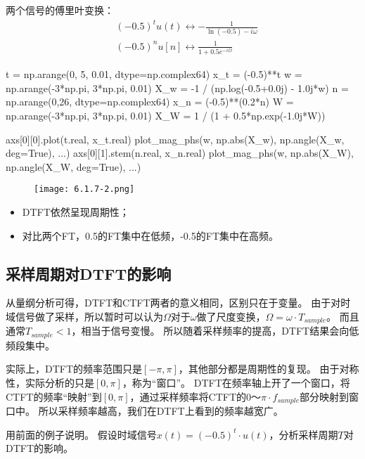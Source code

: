 两个信号的傅里叶变换：
\begin{align*}
&\left( -0.5 \right) ^tu\left( t \right) \leftrightarrow -\frac{1}{\ln \left( -0.5 \right) -i\omega} \\
&\left( -0.5 \right) ^nu\left[ n \right] \leftrightarrow \frac{1}{1+0.5e^{-i\varOmega}}
\end{align*}

\begin{python}
t   = np.arange(0, 5, 0.01, dtype=np.complex64)
x_t = (-0.5)**t
w   = np.arange(-3*np.pi, 3*np.pi, 0.01)
X_w = -1 / (np.log(-0.5+0.0j) - 1.0j*w)
n   = np.arange(0,26, dtype=np.complex64)
x_n = (-0.5)**(0.2*n)
W   = np.arange(-3*np.pi, 3*np.pi, 0.01)
X_W = 1 / (1 + 0.5*np.exp(-1.0j*W))

axs[0][0].plot(t.real, x_t.real)
plot_mag_phs(w, np.abs(X_w), np.angle(X_w, deg=True), ...)
axs[0][1].stem(n.real, x_n.real)
plot_mag_phs(w, np.abs(X_W), np.angle(X_W, deg=True), ...)
\end{python}

\begin{figure}[h]
\centering
\texttt{[image: 6.1.7-2.png]}
\end{figure}

\begin{itemize}
    \item DTFT依然呈现周期性；
    \item 对比两个FT，0.5的FT集中在低频，-0.5的FT集中在高频。
\end{itemize}

\subsection{采样周期对DTFT的影响}

从量纲分析可得，DTFT和CTFT两者的意义相同，区别只在于变量。
由于对时域信号做了采样，所以暂时可以认为$\varOmega $对于$\omega $做了尺度变换，$\varOmega =\omega \cdot T_{sample}$。
而且通常$T_{sample}<1$，相当于信号变慢。
所以随着采样频率的提高，DTFT结果会向低频段集中。

实际上，DTFT的频率范围只是$\left[ -\pi ,\pi \right] $，其他部分都是周期性的复现。
由于对称性，实际分析的只是$\left[ 0,\pi \right] $，称为“窗口”。
DTFT在频率轴上开了一个窗口，将CTFT的频率“映射”到$\left[ 0,\pi \right] $，通过采样频率将CTFT的$0\text{～}\pi \cdot f_{sample}$部分映射到窗口中。
所以采样频率越高，我们在DTFT上看到的频率越宽广。

用前面的例子说明。
假设时域信号$x\left( t \right) =\left( -0.5 \right) ^t\cdot u\left( t \right) $，分析采样周期$T$对DTFT的影响。

